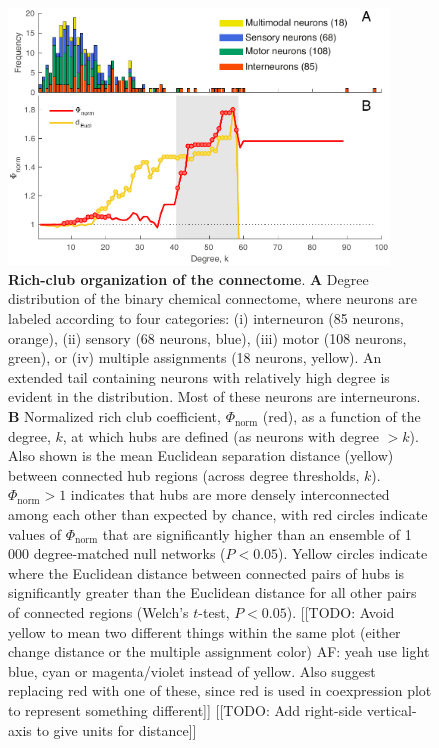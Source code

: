 \documentclass[10pt,letterpaper]{article}
\begin{document}
\begin{figure}[h]
   \centering
    \includegraphics[width=0.9\textwidth]{topology_rich.pdf}
 \caption{\textbf{Rich-club organization of the connectome}.
\textbf{A} Degree distribution of the binary chemical connectome, where neurons are labeled according to four categories:
(i) interneuron (85 neurons, orange),
(ii) sensory (68 neurons, blue),
(iii) motor (108 neurons, green), or
(iv) multiple assignments (18 neurons, yellow).
An extended tail containing neurons with relatively high degree is evident in the distribution.
Most of these neurons are interneurons.
\textbf{B}
Normalized rich club coefficient, $\Phi_\mathrm{norm}$ (red), as a function of the degree, $k$, at which hubs are defined (as neurons with degree $>k$).
Also shown is the mean Euclidean separation distance (yellow) between connected hub regions (across degree thresholds, $k$).
$\Phi_\mathrm{norm} > 1$ indicates that hubs are more densely interconnected among each other than expected by chance, with red circles indicate values of $\Phi_\mathrm{norm}$ that are significantly higher than an ensemble of 1\,000 degree-matched null networks ($P < 0.05$).
Yellow circles indicate where the Euclidean distance between connected pairs of hubs is significantly greater than the Euclidean distance for all other pairs of connected regions (Welch's $t$-test, $P < 0.05$).
[[TODO: Avoid yellow to mean two different things within the same plot (either change distance or the multiple assignment color) AF: yeah use light blue, cyan or magenta/violet instead of yellow. Also suggest replacing red with one of these, since red is used in coexpression plot to represent something different]]
[[TODO: Add right-side vertical-axis to give units for distance]]
}
 \label{fig:topology_rich}
 \end{figure}
\end{document}
